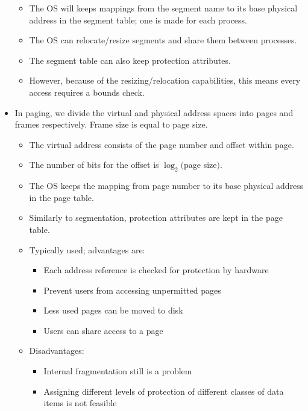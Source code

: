 \documentclass{article}
\begin{document}
\begin{itemize}
\begin{itemize}
            \item The OS will keeps mappings from the segment name to its base physical address in the segment table; one is made for each process.
            \item The OS can relocate/resize segments and share them between processes.
            \item The segment table can also keep protection attributes.
            \item However, because of the resizing/relocation capabilities, this means every access requires a bounds check.
        \end{itemize}
    \item In paging, we divide the virtual and physical address spaces into pages and frames respectively.  Frame size is equal to page size.
        \begin{itemize}
            \item The virtual address consists of the page number and offset within page.
            \item The number of bits for the offset is $\log_2($page size$)$.
            \item The OS keeps the mapping from page number to its base physical address in the page table.
            \item Similarly to segmentation, protection attributes are kept in the page table.
            \item Typically used; advantages are:
                \begin{itemize}
                    \item Each address reference is checked for protection by hardware
                    \item Prevent users from accessing unpermitted pages
                    \item Less used pages can be moved to disk
                    \item Users can share access to a page
                \end{itemize}
            \item Disadvantages:
                \begin{itemize}
                    \item Internal fragmentation still is a problem
                    \item Assigning different levels of protection of different classes of data items is not feasible
                \end{itemize}
        \end{itemize}

\end{itemize}
\end{document}
